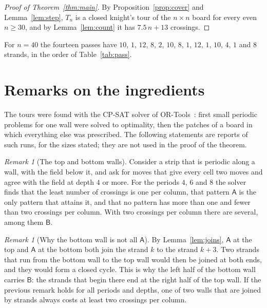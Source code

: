 \documentclass[11pt]{amsart}
\theoremstyle{remark}
\newtheorem{remark}[theorem]{Remark}
\begin{document}
\begin{proof}[Proof of Theorem~\ref{thm:main}]
By Proposition~\ref{prop:cover} and Lemma~\ref{lem:step}, $T_n$ is a closed knight's tour of the $n\times n$ board
for every even $n\ge30$, and by Lemma~\ref{lem:count} it has $7.5\,n+13$ crossings.
\end{proof}

For $n=40$ the fourteen passes have $10$, $1$, $12$, $8$, $2$, $10$, $8$, $1$, $12$, $1$, $10$, $4$, $1$ and $8$
strands, in the order of Table~\ref{tab:pass}.

\section{Remarks on the ingredients}\label{sec:remarks}
The tours were found with the CP-SAT solver of OR-Tools~\cite{ortools}: first small periodic problems for one wall
were solved to optimality, then the patches of a board in which everything else was prescribed. The following
statements are reports of such runs, for the sizes stated; they are not used in the proof of the theorem.

\begin{remark}[The top and bottom walls]
Consider a strip that is periodic along a wall, with the field below it, and ask for moves that give every cell two
moves and agree with the field at depth $4$ or more. For the periods $4$, $6$ and $8$ the solver finds that the
least number of crossings is one per column, that pattern $\mathsf A$ is the only pattern that attains it, and that
no pattern has more than one and fewer than two crossings per column. With two crossings per column there are
several, among them $\mathsf B$.
\end{remark}

\begin{remark}[Why the bottom wall is not all $\mathsf A$]
By Lemma~\ref{lem:joins}, $\mathsf A$ at the top and $\mathsf A$ at the bottom both join the strand $k$ to the strand
$k+3$. Two strands that run from the bottom wall to the top wall would then be joined at both ends, and they would
form a closed cycle. This is why the left half of the bottom wall carries $\mathsf B$: the strands that begin there
end at the right half of the top wall. If the previous remark holds for all periods and depths, one of two walls
that are joined by strands always costs at least two crossings per column.
\end{remark}
\end{document}
